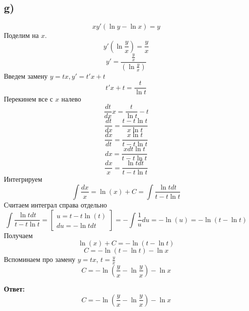 \documentclass[a4paper,12pt]{article}
\begin{document}
\subsection*{g)}
\[
xy'(\ln y - \ln x)  = y 
\]
Поделим на $x$. 
\[
y' ( \ln \frac{y}{x}) = \frac{y}{x}
\]
\[
y' = \frac{\frac{y}{x}}{( \ln \frac{y}{x})}
\]
Введем замену $y = tx, y' = t'x + t$
\[
t'x + t = \frac{t}{\ln t}
\]
Перекинем все с $x$ налево
\[
\frac{dt}{dx} x = \frac{t}{\ln t} - t
\]
\[
\frac{dt}{dx} = \frac{t - t\ln t}{x\ln t}
\]
\[
\frac{dx}{dt} = \frac{x\ln t}{ t - t\ln t}
\]
\[
dx = \frac{x dt \ln t}{ t - t\ln t}
\]
\[
\frac{dx}{x} = \frac{\ln t dt}{t - t  \ln t}
\]
Интегрируем
\[
\int \frac{dx}{x} =  \ln(x) + C  = \int \frac{\ln t dt}{t - t  \ln t}
\]
Считаем интеграл справа отдельно
\[
 \int \frac{\ln t dt}{t - t  \ln t} = \begin{bmatrix}
u = t - t \ln (t) \\
du = - \ln t dt
\end{bmatrix} = - \int \frac{1}{u} du  = - \ln(u) = - \ln (t - \ln t)
\]
Получаем
\[
\ln(x) + C  = - \ln (t - \ln t)
\]
\[
C = - \ln (t - \ln t) - \ln x
\]
Вспоминаем про замену $y = tx$, $t = \frac{y}{x}$
\[
C = - \ln \left(\frac{y}{x}- \ln \frac{y}{x}\right) -  \ln x
\]
\begin{center}
\textbf{Ответ: } 
\[
C = - \ln \left(\frac{y}{x}- \ln \frac{y}{x}\right) - \ln x
\]
\end{center}
\clearpage
\end{document}
